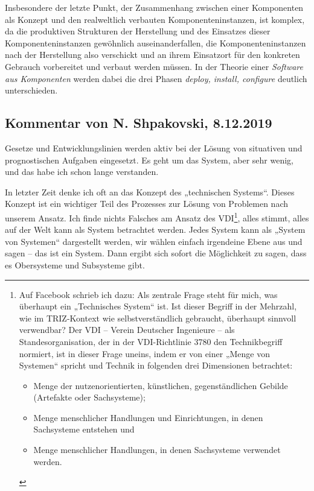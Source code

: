 \documentclass[11pt,a4paper]{article}
\begin{document}
Insbesondere der letzte Punkt, der Zusammenhang zwischen einer Komponenten als
Konzept und den realweltlich verbauten Komponenteninstanzen, ist komplex, da
die produktiven Strukturen der Herstellung und des Einsatzes dieser
Komponenteninstanzen gewöhnlich auseinanderfallen, die Komponenteninstanzen
nach der Herstellung also verschickt und an ihrem Einsatzort für den konkreten
Gebrauch vorbereitet und verbaut werden müssen. In der Theorie einer
\emph{Software aus Komponenten} werden dabei die drei Phasen \emph{deploy,
  install, configure} deutlich unterschieden. 

\subsection{Kommentar von N. Shpakovski, 8.12.2019}

Gesetze und Entwicklungslinien werden aktiv bei der Lösung von situativen und
prognostischen Aufgaben eingesetzt. Es geht um das System, aber sehr wenig,
und das habe ich schon lange verstanden.

In letzter Zeit denke ich oft an das Konzept des „technischen Systems“. Dieses
Konzept ist ein wichtiger Teil des Prozesses zur Lösung von Problemen nach
unserem Ansatz. Ich finde nichts Falsches am Ansatz des VDI\footnote{Auf
  Facebook schrieb ich dazu: Als zentrale Frage steht für mich, was überhaupt
  ein „Technisches System“ ist. Ist dieser Begriff in der Mehrzahl, wie im
  TRIZ-Kontext wie selbstverständlich gebraucht, überhaupt sinnvoll
  verwendbar? Der VDI -- Verein Deutscher Ingenieure -- als
  Standesorganisation, der in der VDI-Richtlinie 3780 den Technikbegriff
  normiert, ist in dieser Frage uneins, indem er von einer „Menge von
  Systemen“ spricht und Technik in folgenden drei Dimensionen betrachtet: 
  \begin{itemize}
  \item Menge der nutzenorientierten, künstlichen, gegenständlichen Gebilde
    (Artefakte oder Sachsysteme);
  \item Menge menschlicher Handlungen und Einrichtungen, in denen Sachsysteme
    entstehen und
  \item Menge menschlicher Handlungen, in denen Sachsysteme verwendet werden.
  \end{itemize}}, alles stimmt, alles auf der Welt kann als System betrachtet
werden.  Jedes System kann als „System von Systemen“ dargestellt werden, wir
wählen einfach irgendeine Ebene aus und sagen -- das ist ein System.  Dann
ergibt sich sofort die Möglichkeit zu sagen, dass es Obersysteme und
Subsysteme gibt.
\end{document}
